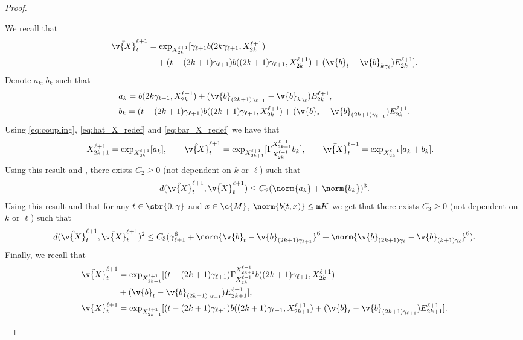 \begin{proof}{}{}
\begin{enumerate}[wide, labelindent=0pt, label=(\alph*)]
\begin{equation}
		      \end{equation}
		      We recall that \begin{align} \bar{\v{X}}_{t}^{\ell+1} & = \exp_{X_{2k}^{\ell+1}}[\gamma_{\ell+1} b(2 k \gamma_{\ell + 1}, X_{2k}^{\ell+1}) \\  & \quad + (t - (2k+1) \gamma_{\ell+1}) b((2 k+1) \gamma_{\ell + 1}, X_{2k}^{\ell+1}) + (\v{b}_{t} - \v{b}_{k \gamma_\ell}) E_{2k}^{\ell+1} ] .
                 \label{eq:bar_X_redef}
		      \end{align}
		      Denote \(a_k, b_k\) such that \begin{align}  & a_k = b(2 k \gamma_{\ell + 1}, X_{2k}^{\ell+1}) + (\v{b}_{(2k+1)\gamma_{\ell+1}} - \v{b}_{k \gamma_\ell}) E_{2k}^{\ell+1} , \\ &b_k = (t - (2k+1)\gamma_{\ell+1}) b((2k+1) \gamma_{\ell + 1}, X_{2k}^{\ell+1}) + (\v{b}_{t} - \v{b}_{(2k+1) \gamma_{\ell+1}}) E_{2k}^{\ell+1} .
		      \end{align}
		      Using \eqref{eq:coupling}, \eqref{eq:hat_X_redef} and \eqref{eq:bar_X_redef} we have that \begin{align}  & X_{2k+1}^{\ell+1} = \exp_{X_{2k}^{\ell+1}}[a_k] , \qquad {\hat{\v{X}}_{t}^{\ell+1} = \exp_{X_{2k+1}^{\ell+1}}[\Gamma_{X_{2k}^{\ell+1}}^{X_{2k+1}^{\ell+1}}b_k] , \qquad \bar{\v{X}}_{t}^{\ell+1} = \exp_{X_{2k}^{\ell+1}}[a_k + b_k] .
              }
		      \end{align}
		      Using this result and \cite[Lemma 3]{sun2019escaping}, there exists \(C_2 \geq 0\) (not dependent on \(k\) or \(\ell\)) such that \begin{equation} d(\hat{\v{X}}_{t}^{\ell+1}, \bar{\v{X}}_{t}^{\ell+1}) \leq C_2 (\norm{a_k} + \norm{b_k})^3 .
		      \end{equation}
		      Using this result and that for any \(t \in \sbr{0,\gamma}\) and \(x \in \c{M}\), \(\norm{b(t,x)} \leq \mathtt{m}{K}\) we get that there exists \(C_3 \geq 0\) (not dependent on \(k\) or \(\ell\)) such that \begin{equation} \label{eq:bound_distance_uno} d(\hat{\v{X}}_{t}^{\ell+1}, \bar{\v{X}}_{t}^{\ell+1})^2 \leq C_3 (\gamma_{\ell+1}^6 + \norm{\v{b}_{t} - \v{b}_{(2k+1) \gamma_{\ell+1}}}^6 + \norm{\v{b}_{(2k+1) \gamma_{\ell}} - \v{b}_{(k+1) \gamma_{\ell}}}^6) .
		      \end{equation}
		      Finally, we recall that \begin{align} \hat{\v{X}}_{t}^{\ell+1} & = \exp_{X_{2k+1}^{\ell+1}}[(t - (2k+1)\gamma_{\ell+1}) \Gamma_{X_{2k}^{\ell+1}}^{X_{2k+1}^{\ell+1}} b((2k+1)\gamma_{\ell+1}, X_{2k}^{\ell+1}) \\ \quad &+ (\v{b}_{t} - \v{b}_{(2k+1) \gamma_{\ell+1}}) E_{2k+1}^{\ell+1}] , \\ \v{X}_{t}^{\ell+1} &= \exp_{X_{2k+1}^{\ell+1}}[(t - (2k+1)\gamma_{\ell+1}) b((2k+1)\gamma_{\ell+1}, X_{2k+1}^{\ell+1}) + (\v{b}_{t} - \v{b}_{(2k+1) \gamma_{\ell+1}}) E_{2k+1}^{\ell+1}] .

\end{align}
\end{enumerate}
\end{proof}
